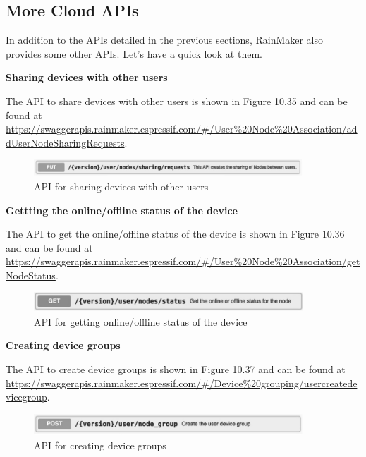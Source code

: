 \documentclass[a4paper,12pt,openany]{book}
\begin{document}
\subsection{More Cloud APIs}
In addition to the APIs detailed in the previous sections, RainMaker also provides some other APIs. Let’s have a quick look at them.

\textbf{Sharing devices with other users}

The API to share devices with other users is shown in Figure 10.35 and can be found at \href{https://swaggerapis.rainmaker.espressif.com/#/User%20Node%20Association/addUserNodeSharingRequests}{https://swaggerapis.rainmaker.espressif.com/\#/User\%20Node\%20Association/addUser\newline NodeSharingRequests}.

\begin{figure}[ht]
    \centering
    \includegraphics[width=0.9\textwidth]{D10Z/10-35}
    \caption{API for sharing devices with other users}
\end{figure}

\textbf{Gettting the online/offline status of the device}

The API to get the online/offline status of the device is shown in Figure 10.36 and can be found at \href{https://swaggerapis.rainmaker.espressif.com/#/User%20Node%20Association/getNodeStatus}{https://swaggerapis.rainmaker.espressif.com/\#/User\%20Node\%20Association/\newline getNodeStatus}.

\begin{figure}[ht]
    \centering
    \includegraphics[width=0.9\textwidth]{D10Z/10-36}
    \caption{API for getting online/offline status of the device}
\end{figure}

\textbf{Creating device groups}

The API to create device groups is shown in Figure 10.37 and can be found at \url{https://swaggerapis.rainmaker.espressif.com/\#/Device\%20grouping/usercreatedevicegroup}.

\begin{figure}[ht]
    \centering
    \includegraphics[width=0.9\textwidth]{D10Z/10-37}
    \caption{API for creating device groups}
\end{figure}
\end{document}
